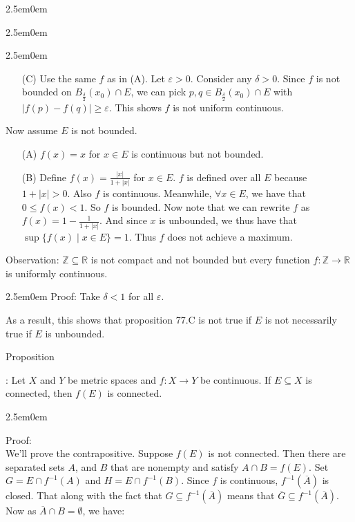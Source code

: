 \documentclass{book}
\newcommand{\hTwo}{%
   \color{MidnightBlue}%
   \fontsize{13}{15}\selectfont%
}
\newcommand{\hThree}{%
   \color{PineGreen}
   \fontsize{13}{15}\selectfont%
}
\newcommand{\exOne}{%
   \color{Purple}%
   \fontsize{14}{16}\selectfont%
}
\newcommand{\exTwo}{%
   \color{RedViolet}%
   \fontsize{13}{15}\selectfont%
}
\newenvironment{myIndent}{%
   \begin{adjustwidth}{2.5em}{0em}%
}{%
   \end{adjustwidth}%
}
\newcommand{\retTwo}{\hfill\bigbreak}
\newcounter{PropNumber}
\newcommand{\propCount}[1][1]{%
   \addtocounter{PropNumber}{#1}%
   \thePropNumber%
}
\begin{document}
{\begin{myIndent}
{\begin{myIndent}
\begin{myIndent}
\begin{itemize}
               \newpage

               \item[(C)] Use the same $f$ as in (A). Let $\varepsilon > 0$. Consider any $\delta > 0$. Since $f$ is not bounded on $B_\frac{\delta}{2}(x_0) \cap E$, we can pick $p, q \in B_\frac{\delta}{2}(x_0) \cap E$ with $|f(p) - f(q)| \geq \varepsilon$. This shows $f$ is not uniform continuous. \retTwo
            \end{itemize}
         \end{myIndent}

         Now assume $E$ is not bounded.
         \begin{itemize}
            \item[(A)] $f(x) = x$ for $x \in E$ is continuous but not bounded. \retTwo
            
            \item[(B)] Define $f(x) = \frac{|x|}{1 + |x|}$ for $x \in E$. $f$ is defined over all $E$ because $1 + |x| > 0$. Also $f$ is continuous. Meanwhile, $\forall x \in E$, we have that $0 \leq f(x) < 1$. So $f$ is bounded. Now note that we can rewrite $f$ as $f(x) = 1 - \frac{1}{1 + |x|}$. And since $x$ is unbounded, we thus have that $\sup\{f(x) \mid x \in E\} = 1$. Thus $f$ does not achieve a maximum. \retTwo
         \end{itemize}
      \end{myIndent}}

      \exOne%
      Observation: $\mathbb{Z} \subseteq \mathbb{R}$ is not compact and not bounded but every function $f: \mathbb{Z} \rightarrow \mathbb{R}$ is uniformly continuous.
      \begin{myIndent}\exTwo%
         Proof: Take $\delta < 1$ for all $\varepsilon$. \retTwo
      \end{myIndent}

      As a result, this shows that proposition 77.C is not true if $E$ is not necessarily true if $E$ is unbounded. \retTwo

      \hTwo%
      Proposition \propCount: Let $X$ and $Y$ be metric spaces and $f: X \rightarrow Y$ be continuous. If $E \subseteq X$ is connected, then $f(E)$ is connected.
      {\begin{myIndent} \hThree
         Proof:\\
         We'll prove the contrapositive. Suppose $f(E)$ is not connected. Then there are separated sets $A$, and $B$ that are nonempty and satisfy $A \cap B = f(E)$. Set $G = E \cap f^{-1}(A)$ and $H = E \cap f^{-1}(B)$. Since $f$ is continuous, $f^{-1}(\overbar{A})$ is closed. That along with the fact that $G \subseteq f^{-1}(\overbar{A})$ means that $\overbar{G} \subseteq f^{-1}(\overbar{A})$. Now as $\overbar{A} \cap B = \emptyset$, we have: 
         

\end{myIndent}}
\end{myIndent}}
\end{document}
